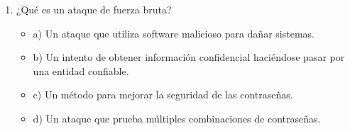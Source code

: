 \documentclass[a4paper]{article}
\begin{document}
\begin{enumerate}
    \item ¿Qué es un ataque de fuerza bruta?
    \begin{itemize}
        \item a) Un ataque que utiliza software malicioso para dañar sistemas.
        \item b) Un intento de obtener información confidencial haciéndose pasar por una entidad confiable.
        \item c) Un método para mejorar la seguridad de las contraseñas.
        \item d) Un ataque que prueba múltiples combinaciones de contraseñas.
    \end{itemize}


    

\end{enumerate}
\end{document}
